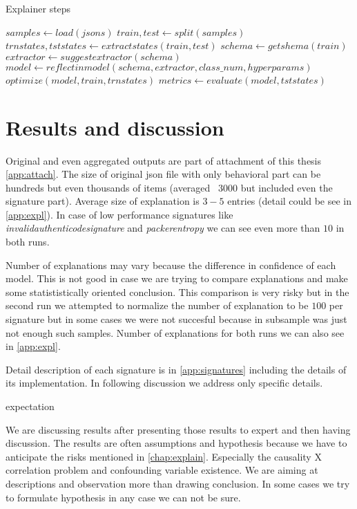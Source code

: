 \begin{algorithm}
  \caption{Explainer steps}\label{algo:explainer}
  \begin{algorithmic}
      \State $samples \gets load(jsons)$
      \State $train,test \gets split(samples)$
      \State $trnstates,tststates \gets extractstates(train, test)$
      \State $schema \gets getshema(train)$
      \State $extractor \gets suggestextractor(schema)$
      \State $model \gets reflectinmodel(schema, extractor, class\_num, hyperparams)$
      \State $optimize(model, train, trnstates)$
      \State $metrics \gets evaluate(model, tststates)$
      \EndProcedure
  \end{algorithmic}
\end{algorithm}



\section{Results and discussion}
Original and even aggregated outputs are part of attachment of this thesis \ref{app:attach}. The size of original json file with only behavioral part can be hundreds but even thousands of items (averaged \texttildelow~$3000$ but included even the signature part). Average size of explanation is $3-5$ entries (detail could be see in \ref{app:expl}). In case of low performance signatures like \emph{invalidauthenticodesignature} and \emph{packerentropy} we can see even more than $10$ in both runs.

Number of explanations may vary because the difference in confidence of each model. This is not good in case we are trying to compare explanations and make some statististically oriented conclusion. This comparison is very risky but in the second run we attempted to normalize the number of explanation to be $100$ per signature but in some cases we were not succesful because in subsample was just not enough such samples. Number of explanations for both runs we can also see in \ref{app:expl}.

Detail description of each signature is in \ref{app:signatures} including the details of its implementation. In following discussion we address only specific details.

expectation

We are discussing results after presenting those results to expert and then having discussion. The results are often assumptions and hypothesis because we have to anticipate the risks mentioned in \ref{chap:explain}. Especially the causality X correlation problem and confounding variable existence. We are aiming at descriptions and observation more than drawing conclusion. In some cases we try to formulate hypothesis in any case we can not be sure.

